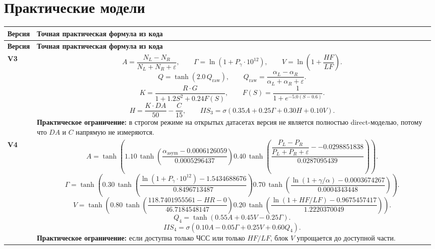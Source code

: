 \documentclass[12pt,a4paper]{article}
\newcommand{\Tnorm}[3]{\tanh\!\left(\frac{#1-#2}{#3}\right)}
\begin{document}
\section{Практические модели}
\begin{landscape}
\small
\begin{longtable}{>{\raggedright\arraybackslash}p{1.6cm} >{\raggedright\arraybackslash}p{16.7cm}}
\toprule
\textbf{Версия} & \textbf{Точная практическая формула из кода} \\
\midrule
\endfirsthead
\toprule
\textbf{Версия} & \textbf{Точная практическая формула из кода} \\
\midrule
\endhead

\textbf{V3} &
\[
A=\frac{N_L-N_R}{N_L+N_R+\varepsilon},
\qquad
\Gamma=\ln(1+P_\gamma\cdot 10^{12}),
\qquad
V=\ln\!\left(1+\frac{HF}{LF}\right).
\]
\[
Q=\tanh(2.0\,Q_{\mathrm{raw}}),
\qquad
Q_{\mathrm{raw}}=\frac{\alpha_L-\alpha_R}{\alpha_L+\alpha_R+\varepsilon}.
\]
\[
K=\frac{R\cdot G}{1+1.2S^2+0.24F(S)},
\qquad
F(S)=\frac{1}{1+e^{-5.0(S-0.6)}}.
\]
\[
H=\frac{K\cdot DA}{50}-\frac{C}{15},
\qquad
IIS_3=\sigma\!\left(0.35A+0.25\Gamma+0.30H+0.10V\right).
\]
\textbf{Практическое ограничение:} в строгом режиме на открытых датасетах версия не является полностью direct-моделью, потому что \(DA\) и \(C\) напрямую не измеряются. \\

\textbf{V4} &
\[
A=\tanh\!\left(
1.10\,\Tnorm{\alpha_{\mathrm{asym}}}{0.0006126059}{0.0005296437}
0.40\,\Tnorm{\dfrac{P_L-P_R}{P_L+P_R+\varepsilon}}{-0.0298851838}{0.0287095439}
\right).
\]
\[
\Gamma=\tanh\!\left(
0.30\,\Tnorm{\ln(1+P_\gamma\cdot 10^{12})}{1.5434688676}{0.8496713487}
0.70\,\Tnorm{\ln(1+\gamma/\alpha)}{0.0003674267}{0.0004343448}
\right).
\]
\[
V=\tanh\!\left(
0.80\,\Tnorm{118.7401955561-HR}{0}{46.7184548147}
0.20\,\Tnorm{\ln(1+HF/LF)}{0.9675457417}{1.2220370049}
\right).
\]
\[
Q_4=\tanh\!\left(0.55A+0.45V-0.25\Gamma\right).
\]
\[
IIS_4=\sigma\!\left(0.10A-0.05\Gamma+0.25V+0.60Q_4\right).
\]
\textbf{Практическое ограничение:} если доступна только ЧСС или только \(HF/LF\), блок \(V\) упрощается до доступной части. \\


\end{longtable}
\end{landscape}
\end{document}
